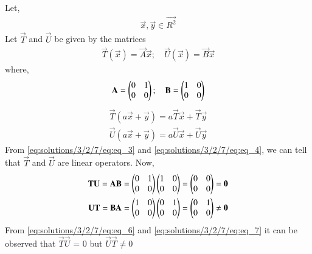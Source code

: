 Let,
\begin{align}\label{eq:solutions/3/2/7/eq:eq_1}
    \vec{x}, \vec{y} \in \vec{R^2}
\end{align}
Let $\vec{T}$ and $\vec{U}$ be given by the matrices
\begin{align}
    \vec{T}(\vec{x}) = \vec{A}\vec{x}; \quad 
    \vec{U}(\vec{x}) = \vec{B}\vec{x} \label{eq:solutions/3/2/7/eq:eq_2a}
\end{align}
where,
\begin{align}
    \mathbf{A} = \begin{pmatrix}0 & 1 \\ 0 & 0\end{pmatrix}; \quad \mathbf{B} = \begin{pmatrix}1 & 0 \\ 0 & 0\end{pmatrix} \label{eq:solutions/3/2/7/eq:eq_2}
\end{align}
\begin{align}
    \vec{T}(a\vec{x} + \vec{y}) = a \vec{T}\vec{x} + \vec{T} \vec{y} \label{eq:solutions/3/2/7/eq:eq_3} \\
    \vec{U}(a\vec{x} + \vec{y}) = a \vec{U}\vec{x} + \vec{U} \vec{y} \label{eq:solutions/3/2/7/eq:eq_4}
\end{align}
From \eqref{eq:solutions/3/2/7/eq:eq_3} and \eqref{eq:solutions/3/2/7/eq:eq_4}, we can tell that $\vec{T}$ and $\vec{U}$ are linear operators. Now,
\begin{align}
    \mathbf{T}\mathbf{U} = \mathbf{A}\mathbf{B} = \begin{pmatrix}0 & 1 \\ 0 & 0\end{pmatrix} \begin{pmatrix}1 & 0 \\ 0 & 0\end{pmatrix} = \begin{pmatrix}0 & 0 \\ 0 & 0\end{pmatrix} = \mathbf{0} \label{eq:solutions/3/2/7/eq:eq_6} \\
    \mathbf{U}\mathbf{T} = \mathbf{B}\mathbf{A} =  \begin{pmatrix}1 & 0 \\ 0 & 0\end{pmatrix} \begin{pmatrix}0 & 1 \\ 0 & 0\end{pmatrix} = \begin{pmatrix}0 & 1 \\ 0 & 0\end{pmatrix} \neq \mathbf{0} \label{eq:solutions/3/2/7/eq:eq_7}
\end{align}
From \eqref{eq:solutions/3/2/7/eq:eq_6} and \eqref{eq:solutions/3/2/7/eq:eq_7} it can be observed that $\vec{T}\vec{U}$ = 0 but $\vec{U}\vec{T} \neq 0$
